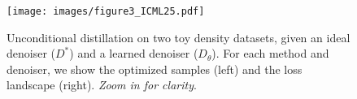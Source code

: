 
\begin{figure}[t]
    \centering
    \texttt{[image: images/figure3\_ICML25.pdf]}
    \vspace{-5mm}
    \caption{Unconditional distillation on two toy density datasets, given an ideal denoiser (\textbf{$D^*$}) and a learned denoiser (\textbf{$D_\theta$}). For each method and denoiser, we show the optimized samples (left) and the loss landscape (right). \emph{Zoom in for clarity}.
    }
    \label{fig:toydensity}
    \vspace{-3mm}
\end{figure}

